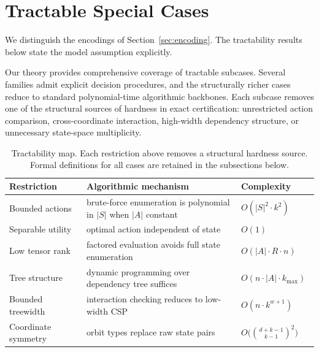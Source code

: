 \section{Tractable Special Cases}\label{sec:tractable}

We distinguish the encodings of Section~\ref{sec:encoding}. The tractability results below state the model assumption explicitly.

Our theory provides comprehensive coverage of tractable subcases. Several families admit explicit decision procedures, and the structurally richer cases reduce to standard polynomial-time algorithmic backbones. Each subcase removes one of the structural sources of hardness in exact certification: unrestricted action comparison, cross-coordinate interaction, high-width dependency structure, or unnecessary state-space multiplicity.

\begin{table}[h]
\centering
\small
\setlength{\tabcolsep}{4pt}
\renewcommand{\arraystretch}{1.12}
\renewcommand{\tabularxcolumn}[1]{m{#1}}
\begin{tabularx}{\linewidth}{@{}>{\raggedright\arraybackslash}m{0.25\linewidth}>{\raggedright\arraybackslash}m{0.50\linewidth}>{\raggedright\arraybackslash}m{0.25\linewidth}@{}}
\toprule
\textbf{Restriction} & \textbf{Algorithmic mechanism} & \textbf{Complexity} \\
\midrule
Bounded actions & brute-force enumeration is polynomial in $|S|$ when $|A|$ constant & $O(|S|^2 \cdot k^2)$ \\
\midrule
Separable utility & optimal action independent of state & $O(1)$ \\
\midrule
Low tensor rank & factored evaluation avoids full state enumeration & $O(|A| \cdot R \cdot n)$ \\
\midrule
Tree structure & dynamic programming over dependency tree suffices & $O(n \cdot |A| \cdot k_{\max})$ \\
\midrule
Bounded treewidth & interaction checking reduces to low-width CSP & $O(n \cdot k^{w+1})$ \\
\midrule
Coordinate symmetry & orbit types replace raw state pairs & $O\!\bigl(\binom{d+k-1}{k-1}^2\bigr)$ \\
\bottomrule
\end{tabularx}
\caption{Tractability map. Each restriction above removes a structural hardness source. Formal definitions for all cases are retained in the subsections below.}
\label{tab:tractability-map}
\end{table}

